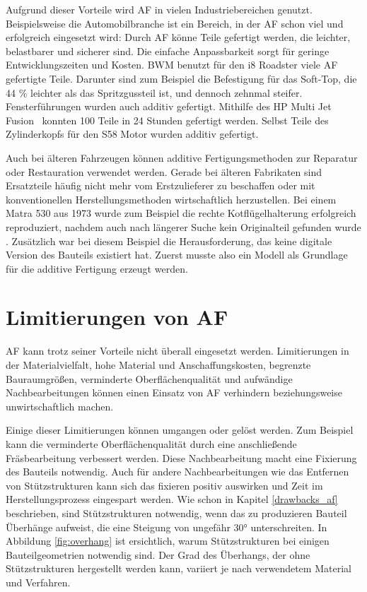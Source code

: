 Aufgrund dieser Vorteile wird AF in vielen Industriebereichen genutzt. 
Beispielsweise die Automobilbranche ist ein Bereich, in der AF schon viel und erfolgreich 
eingesetzt wird:
Durch AF könne Teile gefertigt werden, die leichter, belastbarer und sicherer sind. 
Die einfache Anpassbarkeit sorgt für geringe Entwicklungszeiten und Kosten. 
BWM benutzt für den i8 Roadster viele AF gefertigte Teile.
Darunter sind zum Beispiel die Befestigung für das Soft-Top, die 44 \% leichter als das Spritzgussteil
ist, und dennoch zehnmal steifer.\ \cite{Vafadar.2021} 
Fensterführungen wurden auch additiv gefertigt. Mithilfe des \glqq HP Multi Jet Fusion\grqq~
konnten 
100 Teile in 24 Stunden gefertigt werden. Selbst Teile des Zylinderkopfs für den 
S58 Motor wurden additiv gefertigt. \cite{Anusci.2019}

Auch bei älteren Fahrzeugen können additive Fertigungsmethoden zur 
Reparatur oder Restauration verwendet werden.
Gerade bei älteren Fabrikaten sind Ersatzteile häufig nicht mehr vom 
Erstzulieferer zu beschaffen oder mit konventionellen Herstellungsmethoden
wirtschaftlich herzustellen.
Bei einem Matra 530 aus 1973 wurde zum Beispiel die rechte 
Kotflügelhalterung erfolgreich reproduziert, nachdem auch nach längerer Suche
kein Originalteil gefunden wurde \cite{AMExpo365.03.06.2024}. Zusätzlich war
bei diesem Beispiel die Herausforderung, das keine digitale Version des
Bauteils existiert hat. Zuerst musste also ein Modell als Grundlage für die
additive Fertigung erzeugt werden.

\section{Limitierungen von AF}

AF kann trotz seiner Vorteile nicht überall eingesetzt werden. Limitierungen 
in der Materialvielfalt, hohe Material und Anschaffungskosten, begrenzte
Bauraumgrößen, verminderte Oberflächenqualität und aufwändige Nachbearbeitungen
können einen Einsatz von AF verhindern beziehungsweise unwirtschaftlich machen. 
\cite{inproceedings}

Einige dieser Limitierungen können umgangen oder gelöst werden. 
Zum Beispiel kann die
verminderte Oberflächenqualität durch eine anschließende Fräsbearbeitung
verbessert werden. 
Diese Nachbearbeitung macht eine Fixierung des Bauteils notwendig. Auch für andere
Nachbearbeitungen wie das Entfernen von Stützstrukturen kann sich das fixieren
positiv auswirken und Zeit im Herstellungsprozess eingespart werden.
Wie schon in Kapitel \ref{drawbacks_af} beschrieben, sind 
Stützstrukturen notwendig, wenn das zu produzieren Bauteil Überhänge aufweist,
die eine Steigung von ungefähr 30° unterschreiten. In Abbildung \ref{fig:overhang}
ist ersichtlich, warum Stützstrukturen bei einigen Bauteilgeometrien notwendig
sind. Der Grad des Überhangs, der ohne Stützstrukturen hergestellt werden kann,
variiert je nach verwendetem Material und Verfahren.~\cite{Meng.2020} 

